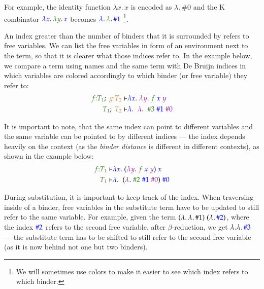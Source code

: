 \documentclass[runningheads]{article}
\newcommand{\tpd}[2]{{#1}{:}{#2}}
\begin{document}
For example, the identity function $\lambda x. \, x$ is encoded as $\lambda. \, \#0$ and the K combinator ${\color{blue}\lambda x}. \, {\color{OliveGreen}\lambda y}. \, {\color{blue}x}$ becomes ${\color{blue}\lambda}. \, {\color{OliveGreen}\lambda}. \, {\color{blue}\#1}$ \footnote{We will sometimes use colors to make it easier to see which index refers to which binder.}.

An index greater than the number of binders that it is surrounded by refers to free variables. We can list the free variables in form of an environment next to the term, so that it is clearer what those indices refer to. In the example below, we compare a term using names and the same term with De Bruijn indices in which variables are colored accordingly to which binder (or free variable) they refer to:
\begin{align*}
 {\color{OliveGreen}\tpd{f}{T_1}}; \; {\color{brown}\tpd{g}{T_2}} \vdash & {\color{blue} \lambda x}. \; {\color{Plum}\lambda y}. \; {\color{OliveGreen}f} \; {\color{blue}x} \; {\color{Plum}y} \\
  {\color{OliveGreen} T_1}; \; {\color{brown}T_2} \vdash & {\color{blue} \lambda}. \;\; {\color{Plum}\lambda}. \;\; {\color{OliveGreen} \#3} \; {\color{blue}\#1} \; {\color{Plum} \#0}
\end{align*}

It is important to note, that the same index can point to different variables and the same variable can be pointed to by different indices --- the index depends heavily on the context (as the \textit{binder distance} is different in different contexts), as shown in the example below:
\begin{align*}
{\color{OliveGreen}\tpd{f}{T_1}} \vdash & {\color{blue} \lambda x}. \; ({\color{Plum}\lambda y}. \; {\color{OliveGreen}f} \; {\color{blue}x} \; {\color{Plum}y}) \; {\color{blue}x} \\
{\color{OliveGreen}T_1} \vdash & {\color{blue} \lambda}. \;\; ({\color{Plum}\lambda}. \; {\color{OliveGreen}\#2} \; {\color{blue}\#1} \; {\color{Plum}\#0}) \; {\color{blue}\#0}
\end{align*}

During substitution, it is important to keep track of the index. When traversing inside of a binder, free variables in the substitute term have to be updated to still refer to the same variable.
For example, given the term $(\lambda. \, \lambda. \, \#1) \; (\lambda. \, {\color{blue}\#2})$, where the index ${\color{blue}\#2}$ refers to the second free variable, after $\beta$-reduction, we get $\lambda. \lambda. \, {\color{blue}\#3}$ --- the substitute term has to be shifted to still refer to the second free variable (as it is now behind not one but two binders).
\end{document}
